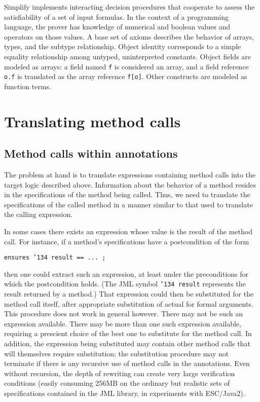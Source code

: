 \documentclass{sig-alternate2}
\begin{document}
Simplify implements interacting decision procedures
 that cooperate to assess the satisfiability of a 
set of input formulas.
In the context of a programming language, the prover has knowledge of numerical and
boolean values and operators on those values.  A base set of axioms describes the behavior 
of arrays, types, and the subtype relationship.  Object identity corresponds to a simple
equality relationship among untyped, uninterpreted constants.  Object fields are modeled as
arrays: a field named \texttt{f} is considered an array, and a field reference \texttt{o.f} is
translated as the array reference \texttt{f[o]}.  Other constructs are modeled as function terms.

\section{Translating method calls}

\subsection{Method calls within annotations}

The problem at hand is to translate expressions containing method calls into the target logic described above.   Information about the behavior of a method resides in
the specifications of the method being called.  Thus, we need to translate the specifications
of the called method
in a manner similar to that used to translate the calling expression.

In some cases there exists an expression whose value is the result of the method call.  For
instance, if a method's specifications have a postcondition of the form
\begin{center}\texttt{ensures \char'134 result == ... ; }\end{center}
then one could extract such an expression, at least under the preconditions for which the
postcondition holds.  (The JML symbol \texttt{\char'134 result} represents the result returned by a method.)  
That expression could then be substituted for the method call itself,
after appropriate substitution of actual for formal arguments.  This procedure does not work
in general however.  There may not be such an expression available.  There may be more than
one such
expression available, requiring a prescient choice of the best one to substitute for the method call.
In addition, the expression being substituted may contain other method calls that
will themselves require substitution; the substitution procedure may not terminate if there is
any recursive use of method calls in the annotations.  Even without recursion, the depth of
rewriting can create very large verification conditions (easily consuming 256MB on the ordinary
but realistic sets of specifications contained in the JML library, in experiments with ESC/Java2).
\end{document}
